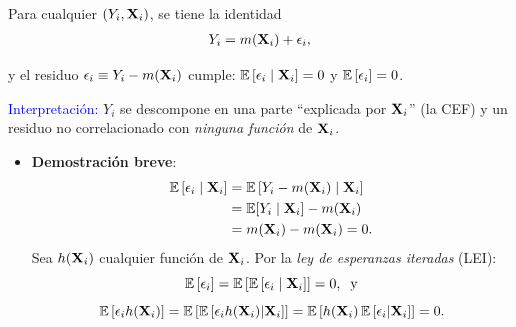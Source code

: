 \documentclass[9pt, xcolor=dvipsnames]{beamer}
\begin{document}
\begin{frame}{}
\begin{tcolorbox}[colback=white, arc=0mm,boxrule=0.5pt, title=Teorema: Descomposición de la CEF, breakable]	
    Para cualquier \((Y_i,\textbf{X}_i)\), se tiene la identidad
    \vspace{-0.75em}
    \begin{align*}
        Y_i = m(\textbf{X}_i) + \epsilon_i,
    \end{align*}
    \vspace{-1.75em}
    
    y el residuo \(\epsilon_i \equiv Y_i - m(\textbf{X}_i)\) cumple: \(\operatorname{\mathbb{E}}\left[\epsilon_i \mid \textbf{X}_i \right] = 0\) y \(\operatorname{\mathbb{E}}\left[\epsilon_i\right] = 0\).
    \vspace{0.5em}
    
    \textcolor{blue}{Interpretación:} \(Y_i\) se descompone en una parte ``explicada por \(\textbf{X}_i\)'' (la CEF) y un residuo no correlacionado con \emph{ninguna función} de \(\textbf{X}_i\).
\end{tcolorbox}
\begin{itemize}
    \item \textbf{Demostración breve}:     \vspace{-0.75em}
\begin{align*}
    \operatorname{\mathbb{E}}\left[\epsilon_i \mid \textbf{X}_i \right] 
        &= \operatorname{\mathbb{E}}\left[ Y_i - m(\textbf{X}_i) \mid \textbf{X}_i \right] \\
        &= \operatorname{\mathbb{E}}[Y_i \mid \textbf{X}_i] - m(\textbf{X}_i) \\
        &= m(\textbf{X}_i) - m(\textbf{X}_i) = 0. 
\end{align*}    
    \vspace{-0.0em}
    Sea \(h(\textbf{X}_i)\) cualquier función de \(\textbf{X}_i\). Por la \textit{ley de esperanzas iteradas} (LEI): 
    \[
    \operatorname{\mathbb{E}}\left[\epsilon_i \right] = \operatorname{\mathbb{E}}\left[\operatorname{\mathbb{E}}\left[\epsilon_i \mid \textbf{X}_i \right] \right] = 0, \;\; \text{y}
    \] 
    \[
    \operatorname{\mathbb{E}}\left[\epsilon_i h(\textbf{X}_i) \right] = \operatorname{\mathbb{E}}\left[\operatorname{\mathbb{E}}\left[\epsilon_i h(\textbf{X}_i) | \textbf{X}_i \right] \right] = \operatorname{\mathbb{E}}\left[h(\textbf{X}_i) \operatorname{\mathbb{E}}\left[\epsilon_i | \textbf{X}_i \right]\right] = 0. 
    \] 
\end{itemize}
\end{frame}
\end{document}

